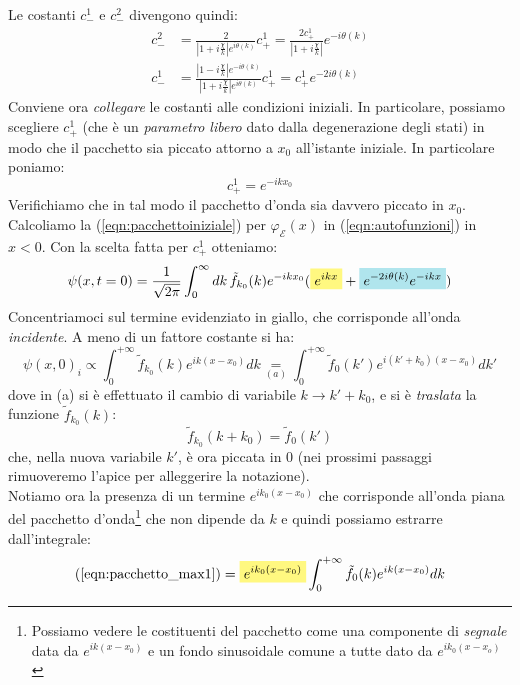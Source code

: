\documentclass[../../FisicaTeorica.tex]{subfiles}
\begin{document}
Le costanti $c_-^1$ e $c_-^2$ divengono quindi:
\begin{align}
c^2_- &= \frac{2}{|1+i\frac{\chi}{k}|e^{i\theta(k)}}c^1_+ = \frac{2 c^1_+}{|1+i\frac{\chi}{k}|}e^{-i\theta(k)}
\label{eqn:c2-}
\\
c^1_- &= \frac{|1-i\frac{\chi}{k}|e^{-i\theta(k)}}{|1+i\frac{\chi}{k}|e^{i\theta(k)}}c^1_+ = c^1_+ e^{-2i\theta(k)}
\label{eqn:c1-}
\end{align}
Conviene ora \textit{collegare} le costanti alle condizioni iniziali. In particolare, possiamo scegliere $c^1_+$ (che è un \textit{parametro libero} dato dalla degenerazione degli stati) in modo che il pacchetto sia piccato attorno a $x_0$ all'istante iniziale. In particolare poniamo:
\begin{equation}
c^1_+ = e^{-ikx_0}
\label{eqn:c1+}
\end{equation}
Verifichiamo che in tal modo il pacchetto d'onda sia davvero piccato in $x_0$. Calcoliamo la (\ref{eqn:pacchettoiniziale}) per $\varphi_\mathcal{E}(x)$ in (\ref{eqn:autofunzioni}) in $x<0$. Con la scelta fatta per $c^1_+$ otteniamo:
\begin{equation}
\psi(x,t=0)=\frac{1}{\sqrt{2\pi}}\int_0^\infty dk\, \tilde{f}_{k_0}(k) e^{-ikx_0}(\hlc{Yellow}{e^{ikx}}+\hlc{SkyBlue}{e^{-2i\theta(k)}e^{-ikx}})
\label{eqn:pacchettonegativo}
\end{equation}
Concentriamoci sul termine evidenziato in giallo, che corrisponde all'onda \textit{incidente}. A meno di un fattore costante si ha:
\begin{equation}
\psi(x,0)_i\propto \int_0^{+\infty}\tilde{f}_{k_0}(k) e^{ik(x-x_0)} dk \underset{(a)}{=}\int_0^{+\infty} \tilde{f}_{0}(k')e^{i(k'+k_0)(x-x_0)}dk'
\label{eqn:pacchetto_max1}
\end{equation}
dove in (a) si è effettuato il cambio di variabile $k\to k'+k_0$, e si è \textit{traslata} la funzione $\tilde{f}_{k_0}(k)$:
\[
\tilde{f}_{k_0}(k+k_0) = \tilde{f}_{0}(k')
\]
che, nella nuova variabile $k'$, è ora piccata in $0$ (nei prossimi passaggi rimuoveremo l'apice per alleggerire la notazione).\\
Notiamo ora la presenza di un termine $e^{ik_0(x-x_0)}$ che corrisponde all'onda piana  del pacchetto d'onda\footnote{Possiamo vedere le costituenti del pacchetto come una componente di \textit{segnale} data da $e^{ik(x-x_0)}$ e un fondo sinusoidale comune a tutte dato da $e^{ik_0(x-x_o)}$}
 che non dipende da $k$ e quindi possiamo estrarre dall'integrale:
\begin{equation}
(\ref{eqn:pacchetto_max1}) = \hlc{Yellow}{e^{ik_0(x-x_0)}}\int_0^{+\infty} \tilde{f}_0(k) e^{ik(x-x_0)}dk
\label{eqn:pacchetto_max2}
\end{equation}
\end{document}
